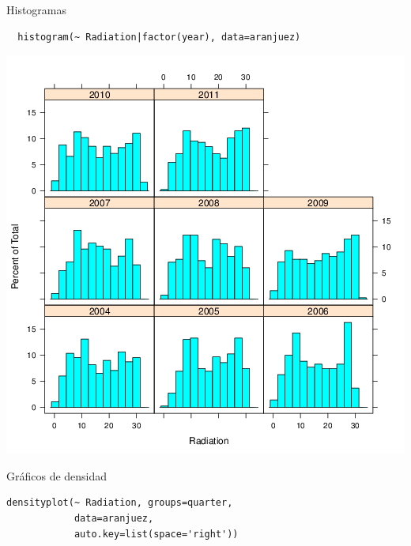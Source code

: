 \documentclass[xcolor={usenames,svgnames,dvipsnames}]{beamer}
\begin{document}
\begin{frame}[fragile,label={sec:orgheadline51}]{Histogramas}
 \lstset{language=R,label= ,caption= ,captionpos=b,numbers=none}
\begin{lstlisting}
  histogram(~ Radiation|factor(year), data=aranjuez)
\end{lstlisting}
\end{frame}

\begin{frame}[label={sec:orgheadline52}]{}
\includegraphics[width=.9\linewidth]{figs/histogram.png}
\end{frame}

\begin{frame}[fragile,label={sec:orgheadline53}]{Gráficos de densidad}
 \lstset{language=R,label= ,caption= ,captionpos=b,numbers=none}
\begin{lstlisting}
densityplot(~ Radiation, groups=quarter,
            data=aranjuez,
            auto.key=list(space='right'))
\end{lstlisting}
\end{frame}
\end{document}
